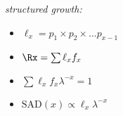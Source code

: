 \textsl{structured growth:}
\begin{itemize}
\item $\ell_x= p_1 \times p_2 \times \ldots p_{x-1}$
\item $\Rx = \sum \ell_x f_x$
\item $\sum \ell_x f_x \lambda^{-x} = 1$
\item $\textrm{SAD}(x) \propto \ell_x \lambda^{-x}$
\end{itemize}
